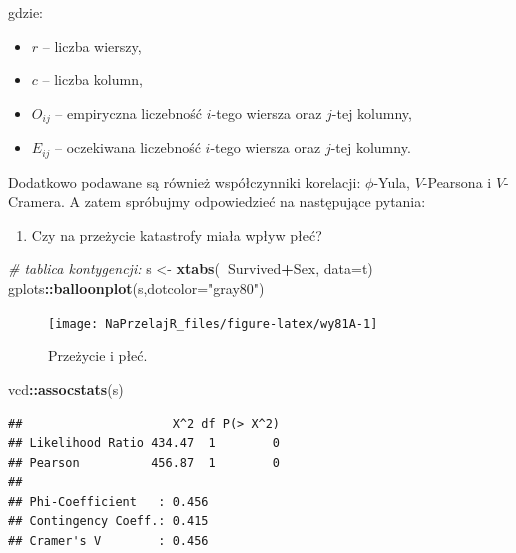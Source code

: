 \documentclass[polish,]{book}
\newenvironment{Shaded}{\begin{snugshade}}{\end{snugshade}}
\newcommand{\CommentTok}[1]{\textcolor[rgb]{0.56,0.35,0.01}{\textit{#1}}}
\newcommand{\DataTypeTok}[1]{\textcolor[rgb]{0.13,0.29,0.53}{#1}}
\newcommand{\KeywordTok}[1]{\textcolor[rgb]{0.13,0.29,0.53}{\textbf{#1}}}
\newcommand{\NormalTok}[1]{#1}
\newcommand{\OperatorTok}[1]{\textcolor[rgb]{0.81,0.36,0.00}{\textbf{#1}}}
\newcommand{\StringTok}[1]{\textcolor[rgb]{0.31,0.60,0.02}{#1}}
\providecommand{\tightlist}{%
  \setlength{\itemsep}{0pt}\setlength{\parskip}{0pt}}
\begin{document}
gdzie:

\begin{itemize}
\item
  \(r\) -- liczba wierszy,
\item
  \(c\) -- liczba kolumn,
\item
  \(O_{ij}\) -- empiryczna liczebność \(i\)-tego wiersza oraz \(j\)-tej kolumny,
\item
  \(E_{ij}\) -- oczekiwana liczebność \(i\)-tego wiersza oraz \(j\)-tej kolumny.
\end{itemize}

Dodatkowo podawane są również współczynniki korelacji: \(\phi\)-Yula, \(V\)-Pearsona i \(V\)-Cramera. A zatem spróbujmy odpowiedzieć na następujące pytania:

\begin{enumerate}
\def\labelenumi{\arabic{enumi}.}
\tightlist
\item
  Czy na przeżycie katastrofy miała wpływ płeć?
\end{enumerate}

\begin{Shaded}
\begin{Highlighting}[]
\CommentTok{# tablica kontygencji:}
\NormalTok{s <-}\StringTok{ }\KeywordTok{xtabs}\NormalTok{(}\OperatorTok{~}\NormalTok{Survived}\OperatorTok{+}\NormalTok{Sex, }\DataTypeTok{data=}\NormalTok{t) }
\NormalTok{gplots}\OperatorTok{::}\KeywordTok{balloonplot}\NormalTok{(s,}\DataTypeTok{dotcolor=}\StringTok{"gray80"}\NormalTok{)}
\end{Highlighting}
\end{Shaded}

\begin{figure}[h]

{\centering \texttt{[image: NaPrzelajR\_files/figure-latex/wy81A-1]} 

}

\caption{Przeżycie i płeć.}\label{fig:wy81A}
\end{figure}

\begin{Shaded}
\begin{Highlighting}[]
\NormalTok{vcd}\OperatorTok{::}\KeywordTok{assocstats}\NormalTok{(s)}
\end{Highlighting}
\end{Shaded}

\begin{verbatim}
##                     X^2 df P(> X^2)
## Likelihood Ratio 434.47  1        0
## Pearson          456.87  1        0
## 
## Phi-Coefficient   : 0.456 
## Contingency Coeff.: 0.415 
## Cramer's V        : 0.456
\end{verbatim}
\end{document}
